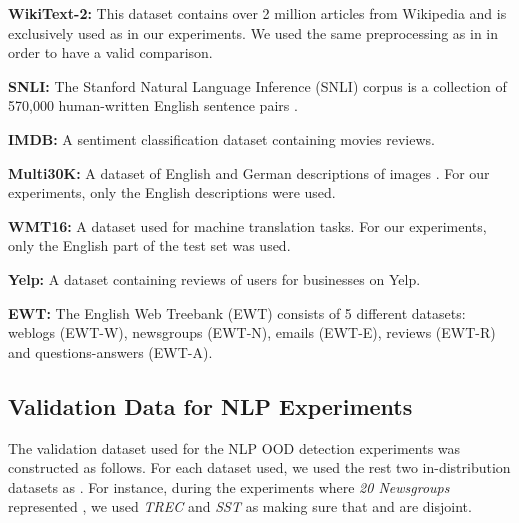 \documentclass{article} \usepackage{iclr2020_conference,times}
\begin{document}
\textbf{WikiText-2: }This dataset contains over 2 million articles from Wikipedia and is exclusively used as  in our experiments. We used the same preprocessing as in \citet{hendrycks2019oe} in order to have a valid comparison.
\vspace{-5pt}

\textbf{SNLI: }The Stanford Natural Language Inference (SNLI) corpus is a collection of 570,000 human-written English sentence pairs \citep{bowman2015large}. 
\vspace{-5pt}

\textbf{IMDB: }A sentiment classification dataset containing movies reviews.
\vspace{-5pt}

\textbf{Multi30K: } A dataset of English and German descriptions of images \citep{2016arXiv160500459E}. For our experiments, only the English descriptions were used.
\vspace{-5pt}

\textbf{WMT16: }A dataset used for machine translation tasks. For our experiments, only the English part of the test set was used.
\vspace{-5pt}

\textbf{Yelp: }A dataset containing reviews of users for businesses on Yelp.
\vspace{-5pt}

\textbf{EWT: }The English Web Treebank (EWT) consists of 5 different datasets: weblogs (EWT-W), newsgroups (EWT-N), emails (EWT-E), reviews (EWT-R) and questions-answers (EWT-A).

\subsection{Validation Data for NLP Experiments}\label{val_text}
The validation dataset  used for the NLP OOD detection experiments was constructed as follows. For each  dataset used, we used the rest two in-distribution datasets as . For instance, during the experiments where {\it20 Newsgroups} represented , we used {\it TREC} and {\it SST} as  making sure that  and  are disjoint.
\end{document}
